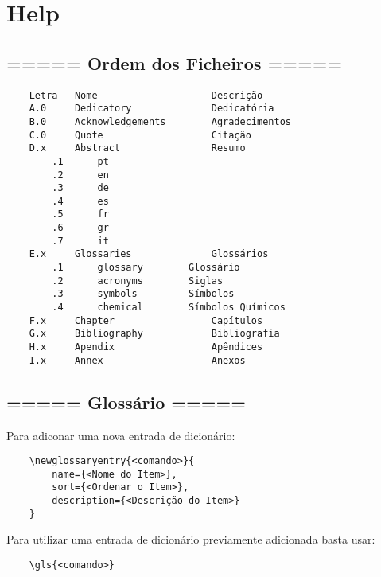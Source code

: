 
%


\chapter{Help}
\label{cha:help}


\section{===== Ordem dos Ficheiros =====}

\begin{verbatim}
    Letra   Nome                    Descrição
    A.0     Dedicatory              Dedicatória
    B.0     Acknowledgements        Agradecimentos
    C.0     Quote                   Citação
    D.x     Abstract                Resumo
        .1      pt
        .2      en
        .3      de
        .4      es
        .5      fr
        .6      gr
        .7      it
    E.x     Glossaries              Glossários
        .1      glossary        Glossário
        .2      acronyms        Siglas
        .3      symbols         Símbolos
        .4      chemical        Símbolos Químicos
    F.x     Chapter                 Capítulos
    G.x     Bibliography            Bibliografia
    H.x     Apendix                 Apêndices
    I.x     Annex                   Anexos
\end{verbatim}


\section{===== Glossário =====}

Para adiconar uma nova entrada de dicionário:

\begin{verbatim}
    \newglossaryentry{<comando>}{
        name={<Nome do Item>},
        sort={<Ordenar o Item>},
        description={<Descrição do Item>}
    }
\end{verbatim}


Para utilizar uma entrada de dicionário previamente adicionada basta usar:

\begin{verbatim}
    \gls{<comando>}
\end{verbatim}


